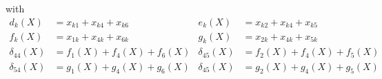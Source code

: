 with 
\begin{align*}
d_k(X) &= x_{k1}+x_{k4}+x_{k6} & e_k(X) &= x_{k2}+x_{k4}+x_{k5}\\
f_k(X) &= x_{1k}+x_{4k}+x_{6k} & g_k(X) &= x_{2k}+x_{4k}+x_{5k}\\
\delta_{44}(X) &= f_1(X) + f_4(X) + f_6(X) & \delta_{45}(X) &= f_2(X) + f_4(X) + f_5(X) \\
\delta_{54}(X) &= g_1(X) + g_4(X) + g_6(X) & \delta_{45}(X) &= g_2(X) + g_4(X) + g_5(X)
\end{align*}


